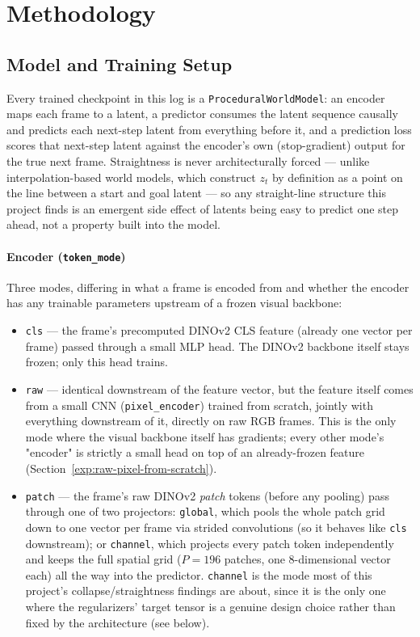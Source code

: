 \section{Methodology}
\label{sec:methodology}

\subsection{Model and Training Setup}
\label{sec:methodology-architecture}

Every trained checkpoint in this log is a \texttt{ProceduralWorldModel}: an encoder maps
each frame to a latent, a predictor consumes the latent sequence causally and predicts
each next-step latent from everything before it, and a prediction loss scores that
next-step latent against the encoder's own (stop-gradient) output for the true next
frame. Straightness is never architecturally forced --- unlike interpolation-based
world models, which construct $z_t$ by definition as a point on the line between a start
and goal latent --- so any straight-line structure this project finds is an emergent
side effect of latents being easy to predict one step ahead, not a property built into
the model.

\paragraph{Encoder (\texttt{token\_mode})} Three modes, differing in what a frame is
encoded from and whether the encoder has any trainable parameters upstream of a frozen
visual backbone:
\begin{itemize}
    \item \texttt{cls} --- the frame's precomputed DINOv2 CLS feature (already one
    vector per frame) passed through a small MLP head. The DINOv2 backbone itself stays
    frozen; only this head trains.
    \item \texttt{raw} --- identical downstream of the feature vector, but the feature
    itself comes from a small CNN (\texttt{pixel\_encoder}) trained from scratch,
    jointly with everything downstream of it, directly on raw RGB frames. This is the
    only mode where the visual backbone itself has gradients; every other mode's
    "encoder" is strictly a small head on top of an already-frozen feature
    (Section~\ref{exp:raw-pixel-from-scratch}).
    \item \texttt{patch} --- the frame's raw DINOv2 \emph{patch} tokens (before any
    pooling) pass through one of two projectors: \texttt{global}, which pools the whole
    patch grid down to one vector per frame via strided convolutions (so it behaves like
    \texttt{cls} downstream); or \texttt{channel}, which projects every patch token
    independently and keeps the full spatial grid ($P{=}196$ patches, one 8-dimensional
    vector each) all the way into the predictor. \texttt{channel} is the mode most of
    this project's collapse/straightness findings are about, since it is the only one
    where the regularizers' target tensor is a genuine design choice rather than fixed
    by the architecture (see below).
\end{itemize}

